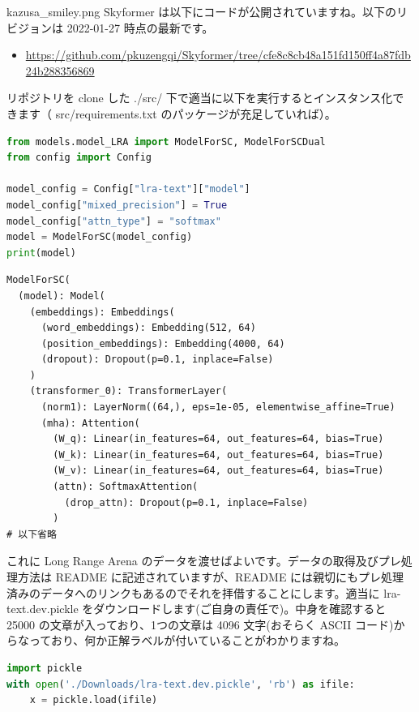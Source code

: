 \documentclass[b5paper,xelatex,ja=standard,10pt]{bxjsarticle}
\begin{document}
\begin{SERIFU}[colback=PaleIris, colbacktitle=PaleIris2]{kazusa_smiley.png}
Skyformer \cite{YifanChen2021} は以下にコードが公開されていますね。以下のリビジョンは 2022-01-27 時点の最新です。
\begin{itemize}
\item \url{https://github.com/pkuzengqi/Skyformer/tree/cfe8c8cb48a151fd150ff4a87fdb24b288356869}
\end{itemize}
リポジトリを clone した ./src/ 下で適当に以下を実行するとインスタンス化できます（ src/requirements.txt のパッケージが充足していれば）。
\begin{CODE}[boxrule=0pt,frame hidden]
\begin{lstlisting}[language=python]
from models.model_LRA import ModelForSC, ModelForSCDual
from config import Config

model_config = Config["lra-text"]["model"]
model_config["mixed_precision"] = True
model_config["attn_type"] = "softmax"
model = ModelForSC(model_config)
print(model)
\end{lstlisting}
\end{CODE}

\begin{CODE}[boxrule=0pt,frame hidden,colback=SlateGray2]
\begin{lstlisting}[basicstyle={\ttfamily\small\color{White}}]
ModelForSC(
  (model): Model(
    (embeddings): Embeddings(
      (word_embeddings): Embedding(512, 64)
      (position_embeddings): Embedding(4000, 64)
      (dropout): Dropout(p=0.1, inplace=False)
    )
    (transformer_0): TransformerLayer(
      (norm1): LayerNorm((64,), eps=1e-05, elementwise_affine=True)
      (mha): Attention(
        (W_q): Linear(in_features=64, out_features=64, bias=True)
        (W_k): Linear(in_features=64, out_features=64, bias=True)
        (W_v): Linear(in_features=64, out_features=64, bias=True)
        (attn): SoftmaxAttention(
          (drop_attn): Dropout(p=0.1, inplace=False)
        )
# 以下省略
\end{lstlisting}
\end{CODE}
これに Long Range Arena のデータを渡せばよいです。データの取得及びプレ処理方法は README に記述されていますが、README には親切にもプレ処理済みのデータへのリンクもあるのでそれを拝借することにします。適当に lra-text.dev.pickle をダウンロードします(ご自身の責任で)。中身を確認すると 25000 の文章が入っており、1つの文章は 4096 文字(おそらく ASCII コード)からなっており、何か正解ラベルが付いていることがわかりますね。
\begin{CODE}[boxrule=0pt,frame hidden]
\begin{lstlisting}[language=python]
import pickle
with open('./Downloads/lra-text.dev.pickle', 'rb') as ifile:
    x = pickle.load(ifile)


\end{lstlisting}
\end{CODE}
\end{SERIFU}
\end{document}
